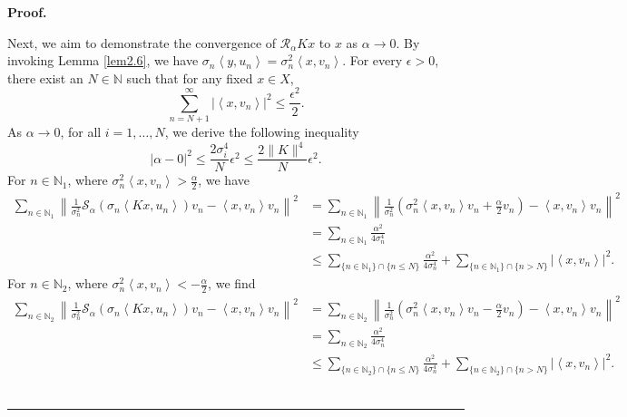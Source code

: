\documentclass[a4paper,12pt]{article}
\numberwithin{equation}{section}
\newenvironment{proof}[1][Proof]{\textbf{#1.} }
{\ \rule{0.75em}{0.75em}\smallskip}
\begin{document}
\begin{proof}
    \par Next, we aim to demonstrate the convergence of $\mathcal{R}_{\alpha}Kx$ to $x$ as $\alpha\rightarrow 0$. By invoking Lemma \ref{lem2.6}, we have $\sigma_{n}\left<y,u_{n}\right>=\sigma_{n}^{2}\left<x,v_{n}\right>$. For every $\epsilon>0$, there exist an $N\in\mathbb{N}$ such that for any fixed $x\in X$,
    \begin{equation*}
        \sum_{n=N+1}^{\infty}|\left<x,v_{n}\right>|^{2}\leq\frac{\epsilon^{2}}{2}.
    \end{equation*}
    As $\alpha\rightarrow 0$, for all $i=1,\dots,N$, we derive the following inequality
    \begin{equation*}
        |\alpha-0|^{2}\leq \frac{2\sigma_{i}^{4}}{N}\epsilon^{2} \leq \frac{2\|K\|^{4}}{N}\epsilon^{2}.
    \end{equation*}
     For $n\in\mathbb{N}_{1}$, where $\sigma_{n}^{2}\left<x,v_{n}\right> >\frac{\alpha}{2}$, we have
    \begin{align}\label{equ3.13}
        \sum_{n\in\mathbb{N}_{1}}\left\|\frac{1}{\sigma_{n}^2}\mathcal{S}_{\alpha}(\sigma_{n}\left<Kx,u_{n}\right>)v_{n}-\left<x,v_{n}\right>v_{n}\right\|^2
        & = \sum_{n\in\mathbb{N}_{1}}\left\|\frac{1}{\sigma_{n}^2}(\sigma_{n}^{2}\left<x,v_{n}\right>v_{n}+\frac{\alpha}{2}v_{n})-\left<x,v_{n}\right>v_{n}\right\|^{2} \nonumber\\
        & =\sum_{n\in\mathbb{N}_{1}}\frac{\alpha^{2}}{4\sigma_{n}^{4}} \nonumber\\
        & \leq \sum_{\{n\in\mathbb{N}_{1}\}\cap\{n\leq N\}}\frac{\alpha^{2}}{4\sigma_{n}^{4}}+\sum_{\{n\in\mathbb{N}_{1}\}\cap \{n> N\}}|\left<x,v_{n}\right>|^{2}.
    \end{align}
    For $n\in\mathbb{N}_{2}$, where $\sigma_{n}^{2}\left<x,v_{n}\right> <-\frac{\alpha}{2}$, we find
    \begin{align}\label{equ3.14}
        \sum_{n\in\mathbb{N}_{2}}\left\|\frac{1}{\sigma_{n}^2}\mathcal{S}_{\alpha}(\sigma_{n}\left<Kx,u_{n}\right>)v_{n}-\left<x,v_{n}\right>v_{n}\right\|^2
        & = \sum_{n\in\mathbb{N}_{2}}\left\|\frac{1}{\sigma_{n}^2}(\sigma_{n}^{2}\left<x,v_{n}\right>v_{n}-\frac{\alpha}{2}v_{n})-\left<x,v_{n}\right>v_{n}\right\|^2 \nonumber\\
        & =\sum_{n\in\mathbb{N}_{2}}\frac{\alpha^{2}}{4\sigma_{n}^{4}} \nonumber\\
        & \leq \sum_{\{n\in\mathbb{N}_{2}\}\cap\{n\leq N\}}\frac{\alpha^{2}}{4\sigma_{n}^{4}}+\sum_{\{n\in\mathbb{N}_{2}\}\cap \{n> N\}}|\left<x,v_{n}\right>|^{2}.

\end{align}
\end{proof}
\end{document}
